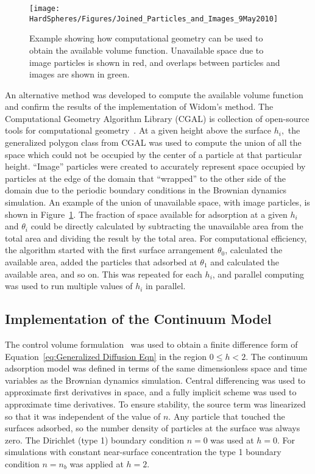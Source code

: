 %
\begin{figure}
\texttt{[image: HardSpheres/Figures/Joined\_Particles\_and\_Images\_9May2010]}

\caption{\label{fig:Computational geometry}Example showing how computational
geometry can be used to obtain the available volume function. Unavailable
space due to image particles is shown in red, and overlaps between
particles and images are shown in green.}


%
\end{figure}
An alternative method was developed to compute the available volume
function and confirm the results of the implementation of Widom's
method. The Computational Geometry Algorithm Library (CGAL) is collection
of open-source tools for computational geometry~\cite{CGAL}. At
a given height above the surface $h_{i},$ the generalized polygon
class from CGAL was used to compute the union of all the space which\emph{
}could not be occupied by the center of a particle at that particular
height. {}``Image'' particles were created to accurately represent
space occupied by particles at the edge of the domain that {}``wrapped''
to the other side of the domain due to the periodic boundary conditions
in the Brownian dynamics simulation. An example of the union of unavailable
space, with image particles, is shown in Figure~\ref{fig:Computational geometry}.
The fraction of space available for adsorption at a given $h_{i}$
and $\theta_{i}$ could be directly calculated by subtracting the
unavailable area from the total area and dividing the result by the
total area. For computational efficiency, the algorithm started with
the first surface arrangement $\theta_{0}$, calculated the available
area, added the particles that adsorbed at $\theta_{1}$ and calculated
the available area, and so on. This was repeated for each $h_{i}$,
and parallel computing was used to run multiple values of $h_{i}$
in parallel.


\subsection{Implementation of the Continuum Model}

The control volume formulation~\cite{Patankar1980} was used to obtain
a finite difference form of Equation~\ref{eq:Generalized Diffusion Eqn}
in the region $0\leq h<2$. The continuum adsorption model was defined
in terms of the same dimensionless space and time variables as the
Brownian dynamics simulation. Central differencing was used to approximate
first derivatives in space, and a fully implicit scheme was used to
approximate time derivatives. To ensure stability, the source term
was linearized so that it was independent of the value of $n$. Any
particle that touched the surfaces adsorbed, so the number density
of particles at the surface was always zero. The Dirichlet (type 1)
boundary condition $n=0$ was used at $h=0$. For simulations with
constant near-surface concentration the type 1 boundary condition
$n=n_{b}$ was applied at $h=2$. 



